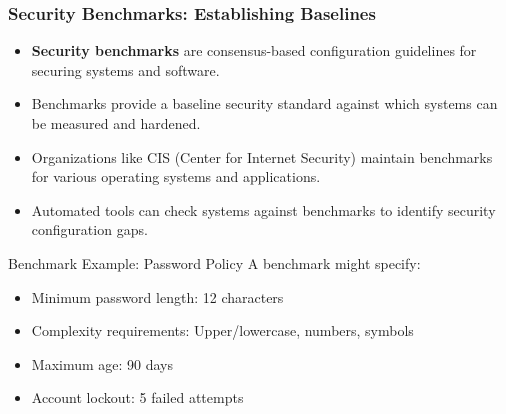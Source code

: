 \documentclass{beamer}
\begin{document}
    \begin{frame}
    \frametitle{Security Benchmarks: Establishing Baselines}
    \begin{itemize}
    \item \textbf{Security benchmarks} are consensus-based configuration guidelines for securing systems and software.
    \item Benchmarks provide a baseline security standard against which systems can be measured and hardened.
    \item Organizations like CIS (Center for Internet Security) maintain benchmarks for various operating systems and applications.
    \item Automated tools can check systems against benchmarks to identify security configuration gaps.
    \end{itemize}
    
    \begin{exampleblock}{Benchmark Example: Password Policy}
        \scriptsize
    A benchmark might specify:
    \begin{itemize}
    \item Minimum password length: 12 characters
    \item Complexity requirements: Upper/lowercase, numbers, symbols
    \item Maximum age: 90 days
    \item Account lockout: 5 failed attempts
    \end{itemize}
    \end{exampleblock}
    \end{frame}
    
\end{document}

